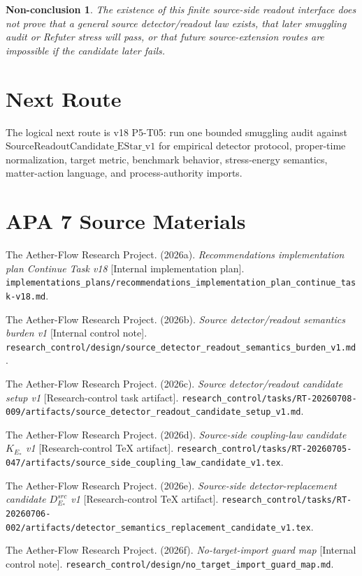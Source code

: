 \documentclass[11pt]{article}
\newtheorem{nonconclusion}{Non-conclusion}
\begin{document}
\begin{nonconclusion}
The existence of this finite source-side readout interface does not prove
that a general source detector/readout law exists, that later smuggling audit
or Refuter stress will pass, or that future source-extension routes are
impossible if the candidate later fails.
\end{nonconclusion}

\section{Next Route}

The logical next route is v18 P5-T05: run one bounded smuggling audit against
\(\mathrm{SourceReadoutCandidate\_EStar\_v1}\) for empirical detector
protocol, proper-time normalization, target metric, benchmark behavior,
stress-energy semantics, matter-action language, and process-authority
imports.

\section{APA 7 Source Materials}

The Aether-Flow Research Project. (2026a). \emph{Recommendations
implementation plan Continue Task v18} [Internal implementation plan].
\texttt{implementations\_plans/recommendations\_implementation\_plan\_continue\_task-v18.md}.

The Aether-Flow Research Project. (2026b). \emph{Source detector/readout
semantics burden v1} [Internal control note].
\texttt{research\_control/design/source\_detector\_readout\_semantics\_burden\_v1.md}.

The Aether-Flow Research Project. (2026c). \emph{Source detector/readout
candidate setup v1} [Research-control task artifact].
\texttt{research\_control/tasks/RT-20260708-009/artifacts/source\_detector\_readout\_candidate\_setup\_v1.md}.

The Aether-Flow Research Project. (2026d). \emph{Source-side coupling-law
candidate \(K_{E_{\ast}}\) v1} [Research-control TeX artifact].
\texttt{research\_control/tasks/RT-20260705-047/artifacts/source\_side\_coupling\_law\_candidate\_v1.tex}.

The Aether-Flow Research Project. (2026e). \emph{Source-side
detector-replacement candidate \(D^{src}_{E_{\ast}}\) v1} [Research-control
TeX artifact].
\texttt{research\_control/tasks/RT-20260706-002/artifacts/detector\_semantics\_replacement\_candidate\_v1.tex}.

The Aether-Flow Research Project. (2026f). \emph{No-target-import guard map}
[Internal control note].
\texttt{research\_control/design/no\_target\_import\_guard\_map.md}.
\end{document}
